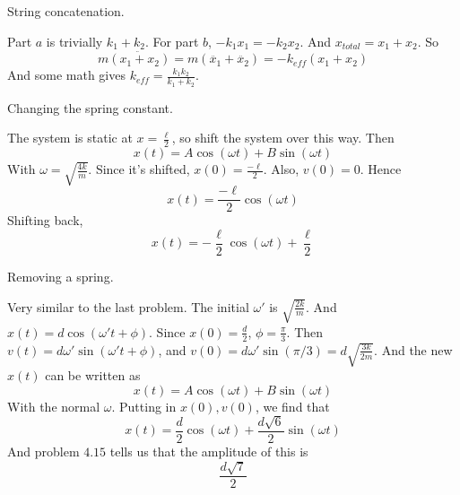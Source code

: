 \documentclass[11pt]{scrartcl}
\begin{document}
\begin{example}
  [4.17]
  String concatenation.
\end{example}
\begin{soln}
  Part $a$ is trivially $k_1+k_2$.
  For part $b$, $-k_1x_1=-k_2x_2$. And $x_{total}=x_1+x_2$. So
  $$m\ddot{(x_1+x_2)}=m(\ddot{x_1}+\ddot{x_2})=-k_{eff}(x_1+x_2)$$
  And some math gives $k_{eff}=\frac{k_1k_2}{k_1+k_2}$.
\end{soln}
\begin{example}
  [4.18]
  Changing the spring constant.
\end{example}
\begin{soln}
  The system is static at $x=\frac{\ell}{2}$, so shift the system over this way. Then
  $$x(t)=A\cos(\omega t)+B\sin(\omega t)$$
  With $\omega=\sqrt{\frac{4k}{m}}$. Since it's shifted, $x(0)=\frac{-\ell}{2}$. Also, $v(0)=0$. Hence
  $$x(t)=\frac{-\ell}{2}\cos(\omega t)$$
  Shifting back,
  $$x(t)=-\frac{\ell}{2}\cos(\omega t)+\frac{\ell}{2}$$
\end{soln}
\begin{example}
  [4.19]
  Removing a spring.
\end{example}
\begin{soln}
  Very similar to the last problem. The initial $\omega'$ is $\sqrt{\frac{2k}{m}}$.
  And $x(t)=d\cos(\omega't+\phi)$. Since $x(0)=\frac{d}{2}$, $\phi=\frac{\pi}{3}$.
  Then $v(t)=d\omega'\sin(\omega't+\phi)$, and $v(0)=d\omega'\sin(\pi/3)=d\sqrt{\frac{3k}{2m}}$.
  And the new $x(t)$ can be written as
  $$x(t)=A\cos(\omega t)+B\sin(\omega t)$$
  With the normal $\omega$. Putting in $x(0), v(0)$, we find that
  $$x(t)=\frac{d}{2}\cos(\omega t)+\frac{d\sqrt{6}}{2}\sin(\omega t)$$
  And problem $4.15$ tells us that the amplitude of this is
  $$\frac{d\sqrt{7}}{2}$$
\end{soln}
\end{document}
